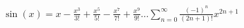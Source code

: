 \documentclass[preview]{standalone}
\begin{document}
\begin{align*}
\sin(x)= x-\frac{x^3}{3 !}+\frac{x^5}{5 !}-\frac{x^7}{7 !}+\frac{x^9}{9 !}\ldots \sum_{n=0}^{\infty} \frac{(-1)^n}{(2 n+1) !} x^{2 n+1}
\end{align*}
\end{document}
